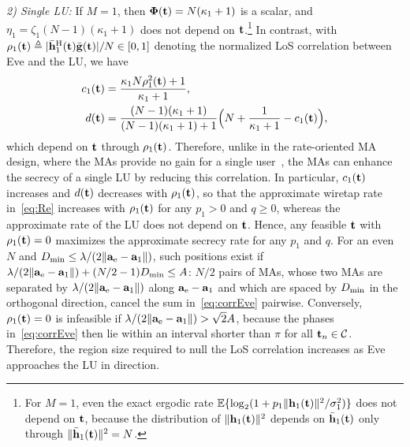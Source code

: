 \documentclass[journal]{IEEEtran}
\newcommand{\rev}[1]{{\color{red}#1}}
\newcommand{\rev}[1]{#1}
\begin{document}
\textit{2) Single LU:} If $M=1$, then $\boldsymbol{\Phi}(\mathbf{t})=N(\kappa_1+1)$ is a scalar, and $\eta_1=\zeta_1(N-1)(\kappa_1+1)$ does not depend on $\mathbf{t}$.\footnote{For $M=1$, even the exact ergodic rate $\mathbb{E}\{\log_2(1+p_1\|\mathbf{h}_1(\mathbf{t})\|^2/\sigma_1^2)\}$ does not depend on $\mathbf{t}$, because the distribution of $\|\mathbf{h}_1(\mathbf{t})\|^2$ depends on $\bar{\mathbf{h}}_1(\mathbf{t})$ only through $\|\bar{\mathbf{h}}_1(\mathbf{t})\|^2=N$.} In contrast, with $\rho_1(\mathbf{t})\triangleq|\bar{\mathbf{h}}_1^{\mathrm H}(\mathbf{t})\bar{\mathbf{g}}(\mathbf{t})|/N\in[0,1]$ denoting the normalized LoS correlation between Eve and the LU, we have
\begin{align}
c_1(\mathbf{t})&=\frac{\kappa_1N\rho_1^2(\mathbf{t})+1}{\kappa_1+1},\label{eq:c1}\\
d(\mathbf{t})&=\frac{(N-1)(\kappa_1+1)}{(N-1)(\kappa_1+1)+1}\Big(N+\frac{1}{\kappa_1+1}-c_1(\mathbf{t})\Big),\label{eq:d1}
\end{align}
which depend on $\mathbf{t}$ through $\rho_1(\mathbf{t})$. Therefore, unlike in the rate-oriented MA design, where the MAs provide no gain for a single user~\cite[Remark~2]{ZhengTCOM2025}, the MAs can enhance the secrecy of a single LU by reducing this correlation. \rev{In particular, $c_1(\mathbf{t})$ increases and $d(\mathbf{t})$ decreases with $\rho_1(\mathbf{t})$, so that the approximate wiretap rate in~\eqref{eq:Re} increases with $\rho_1(\mathbf{t})$ for any $p_1>0$ and $q\ge0$, whereas the approximate rate of the LU does not depend on $\mathbf{t}$. Hence, any feasible $\mathbf{t}$ with $\rho_1(\mathbf{t})=0$ maximizes the approximate secrecy rate for any $p_1$ and $q$. For an even $N$ and $D_{\min}\le\lambda/(2\|\mathbf{a}_{\mathrm e}-\mathbf{a}_1\|)$, such positions exist if $\lambda/(2\|\mathbf{a}_{\mathrm e}-\mathbf{a}_1\|)+(N/2-1)D_{\min}\le A$: $N/2$ pairs of MAs, whose two MAs are separated by $\lambda/(2\|\mathbf{a}_{\mathrm e}-\mathbf{a}_1\|)$ along $\mathbf{a}_{\mathrm e}-\mathbf{a}_1$ and which are spaced by $D_{\min}$ in the orthogonal direction, cancel the sum in~\eqref{eq:corrEve} pairwise. Conversely, $\rho_1(\mathbf{t})=0$ is infeasible if $\lambda/(2\|\mathbf{a}_{\mathrm e}-\mathbf{a}_1\|)>\sqrt2A$, because the phases in~\eqref{eq:corrEve} then lie within an interval shorter than $\pi$ for all $\mathbf{t}_n\in\mathcal C$. Therefore, the region size required to null the LoS correlation increases as Eve approaches the LU in direction.}
\end{document}
